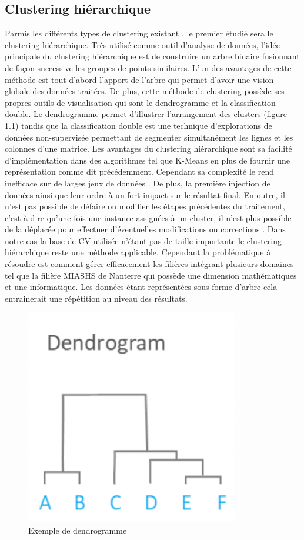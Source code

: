 \documentclass[memoire.tex]{subfiles}
\begin{document}
		\subsection{Clustering hiérarchique}
Parmis les différents types de clustering existant \cite{ref4}, le premier étudié sera le clustering hiérarchique. Très utilisé comme outil d'analyse de données, l'idée principale du clustering hiérarchique est de construire un arbre binaire fusionnant de façon successive les groupes de points similaires. L'un des avantages de cette méthode est tout d'abord l'apport de l'arbre qui permet d'avoir une vision globale des données traitées. De plus, cette méthode de clustering possède ses propres outils de visualisation qui sont le dendrogramme et la classification double. Le dendrogramme permet d'illustrer l'arrangement des clusters (figure 1.1)  tandis que la classification double est une technique d'explorations de données non-supervisée permettant de segmenter simultanément les lignes et les colonnes d'une matrice. Les avantages du clustering hiérarchique sont sa facilité d'implémentation dans des algorithmes tel que K-Means en plus de fournir une représentation comme dit précédemment. Cependant sa complexité le rend inefficace sur de larges jeux de données \cite{ref7}. De plus, la première injection de données ainsi que leur  ordre à un fort impact sur le résultat final. En outre, il n'est pas possible de défaire ou modifier les étapes précédentes du traitement, c'est à dire qu'une fois une instance assignées à un cluster, il n'est plus possible de la déplacée pour effectuer d'éventuelles modifications ou corrections \cite{ref5}. Dans notre cas la base de CV utilisée n'étant pas de taille importante le clustering hiérarchique reste une méthode applicable. Cependant la problématique à résoudre est comment gérer efficacement les filières intégrant plusieurs domaines tel que la filière MIASHS de Nanterre qui possède une dimension mathématiques et une informatique. Les données étant représentées sous forme d'arbre cela entrainerait une répétition au niveau des résultats.
	\begin{figure}
		\includegraphics[scale=0.8]{img/hierarchical_clustering.png}
		\caption{Exemple de dendrogramme}
	\end{figure}
	
\end{document}

